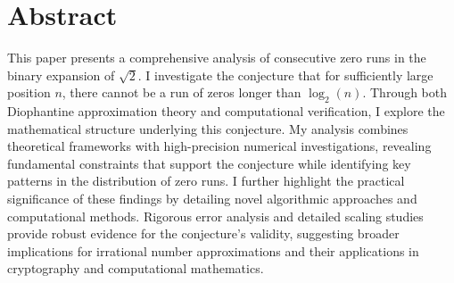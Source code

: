 
\section*{Abstract}
This paper presents a comprehensive analysis of consecutive zero runs in the binary expansion of $\sqrt{2}$. I investigate the conjecture that for sufficiently large position $n$, there cannot be a run of zeros longer than $\log_2(n)$. Through both Diophantine approximation theory and computational verification, I explore the mathematical structure underlying this conjecture. My analysis combines theoretical frameworks with high-precision numerical investigations, revealing fundamental constraints that support the conjecture while identifying key patterns in the distribution of zero runs. I further highlight the practical significance of these findings by detailing novel algorithmic approaches and computational methods. Rigorous error analysis and detailed scaling studies provide robust evidence for the conjecture's validity, suggesting broader implications for irrational number approximations and their applications in cryptography and computational mathematics.
